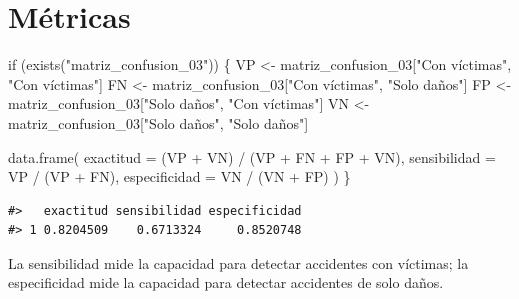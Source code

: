 \documentclass[
  spanish,
  10.5pt,
  letterpaper,
  openany,
  headings=big]{scrbook}
\newenvironment{Shaded}{}{}
\newcommand{\AttributeTok}[1]{\textcolor[rgb]{0.84,0.23,0.29}{#1}}
\newcommand{\ControlFlowTok}[1]{\textcolor[rgb]{0.84,0.23,0.29}{#1}}
\newcommand{\FunctionTok}[1]{\textcolor[rgb]{0.44,0.26,0.76}{#1}}
\newcommand{\NormalTok}[1]{\textcolor[rgb]{0.14,0.16,0.18}{#1}}
\newcommand{\OtherTok}[1]{\textcolor[rgb]{0.44,0.26,0.76}{#1}}
\newcommand{\SpecialCharTok}[1]{\textcolor[rgb]{0.00,0.36,0.77}{#1}}
\newcommand{\StringTok}[1]{\textcolor[rgb]{0.01,0.18,0.38}{#1}}
\begin{document}
\section{Métricas}\label{muxe9tricas}

\begin{Shaded}
\begin{Highlighting}[]
\ControlFlowTok{if}\NormalTok{ (}\FunctionTok{exists}\NormalTok{(}\StringTok{"matriz\_confusion\_03"}\NormalTok{)) \{}
\NormalTok{  VP }\OtherTok{\textless{}{-}}\NormalTok{ matriz\_confusion\_03[}\StringTok{"Con víctimas"}\NormalTok{, }\StringTok{"Con víctimas"}\NormalTok{]}
\NormalTok{  FN }\OtherTok{\textless{}{-}}\NormalTok{ matriz\_confusion\_03[}\StringTok{"Con víctimas"}\NormalTok{, }\StringTok{"Solo daños"}\NormalTok{]}
\NormalTok{  FP }\OtherTok{\textless{}{-}}\NormalTok{ matriz\_confusion\_03[}\StringTok{"Solo daños"}\NormalTok{, }\StringTok{"Con víctimas"}\NormalTok{]}
\NormalTok{  VN }\OtherTok{\textless{}{-}}\NormalTok{ matriz\_confusion\_03[}\StringTok{"Solo daños"}\NormalTok{, }\StringTok{"Solo daños"}\NormalTok{]}

  \FunctionTok{data.frame}\NormalTok{(}
    \AttributeTok{exactitud =}\NormalTok{ (VP }\SpecialCharTok{+}\NormalTok{ VN) }\SpecialCharTok{/}\NormalTok{ (VP }\SpecialCharTok{+}\NormalTok{ FN }\SpecialCharTok{+}\NormalTok{ FP }\SpecialCharTok{+}\NormalTok{ VN),}
    \AttributeTok{sensibilidad =}\NormalTok{ VP }\SpecialCharTok{/}\NormalTok{ (VP }\SpecialCharTok{+}\NormalTok{ FN),}
    \AttributeTok{especificidad =}\NormalTok{ VN }\SpecialCharTok{/}\NormalTok{ (VN }\SpecialCharTok{+}\NormalTok{ FP)}
\NormalTok{  )}
\NormalTok{\}}
\end{Highlighting}
\end{Shaded}

\begin{verbatim}
#>   exactitud sensibilidad especificidad
#> 1 0.8204509    0.6713324     0.8520748
\end{verbatim}

\begin{tcolorbox}[enhanced jigsaw, arc=.35mm, bottomrule=.15mm, bottomtitle=1mm, breakable, colback=white, colbacktitle=quarto-callout-tip-color!10!white, colframe=quarto-callout-tip-color-frame, coltitle=black, left=2mm, leftrule=.75mm, opacityback=0, opacitybacktitle=0.6, rightrule=.15mm, title=\textcolor{quarto-callout-tip-color}{\faLightbulb}\hspace{0.5em}{Interpretación del resultado}, titlerule=0mm, toprule=.15mm, toptitle=1mm]

La sensibilidad mide la capacidad para detectar accidentes con víctimas;
la especificidad mide la capacidad para detectar accidentes de solo
daños.

\end{tcolorbox}
\end{document}
